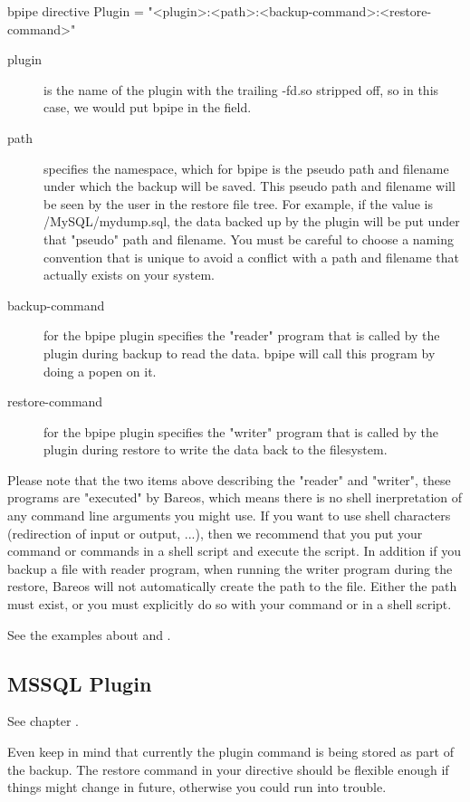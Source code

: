\begin{bconfig}{bpipe directive}
Plugin = "<plugin>:<path>:<backup-command>:<restore-command>"
\end{bconfig}

\begin{description}
\item[plugin] is the name of the plugin with the trailing -fd.so stripped off, so in this case, we would put bpipe in the field.

\item[path] specifies the namespace, which for bpipe is the pseudo path and filename under which the backup will be saved. This
pseudo path and filename will be seen by the user in the restore file tree. For example, if the value is /MySQL/mydump.sql, the data
backed up by the plugin will be put under that "pseudo" path and filename. You must be careful to choose a naming convention that is unique
to avoid a conflict with a path and filename that actually exists on your system.

\item[backup-command] for the bpipe plugin specifies the "reader" program that is called by the plugin during backup to read the data. bpipe
will call this program by doing a popen on it.

\item[restore-command] for the bpipe plugin specifies the "writer" program that is called by the plugin during restore to write the data back 
to the filesystem.
\end{description}

Please note that the two items above describing the "reader" and "writer", these programs are "executed" by Bareos, which means 
there is no shell inerpretation of any command line arguments you might use. If you want to use shell characters (redirection of input 
or output, ...), then we recommend that you put your command or commands in a shell script and execute the script. In addition if you
backup a file with reader program, when running the writer program during the restore, Bareos will not automatically create the path
to the file. Either the path must exist, or you must explicitly do so with your command or in a shell script.

See the examples about  and .

\subsection{MSSQL Plugin}

See chapter .

Even keep in mind that currently the plugin command is being stored as part of the backup. The restore command in your directive 
should be flexible enough if things might change in future, otherwise you could run into trouble.

